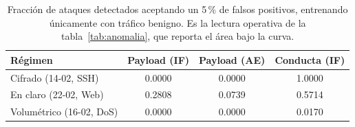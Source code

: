 \begin{table}[htbp]
  \centering
  \caption[Detección no supervisada al 5\,\% de falsos positivos]{Fracción de ataques detectados aceptando un 5\,\% de falsos positivos, entrenando únicamente con tráfico benigno. Es la lectura operativa de la tabla~\ref{tab:anomalia}, que reporta el área bajo la curva.}
  \label{tab:anexo-5fpr}
  \begin{tabular}{lccc}
    \toprule
    \textbf{Régimen} & \textbf{Payload (IF)} & \textbf{Payload (AE)} & \textbf{Conducta (IF)} \\
    \midrule
    Cifrado (14-02, SSH) & 0.0000 & 0.0000 & 1.0000 \\
    En claro (22-02, Web) & 0.2808 & 0.0739 & 0.5714 \\
    Volumétrico (16-02, DoS) & 0.0000 & 0.0000 & 0.0170 \\
    \bottomrule
  \end{tabular}
\end{table}
